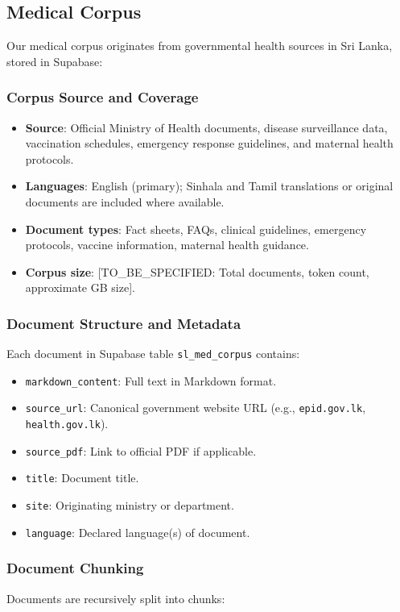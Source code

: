 \documentclass[11pt,a4paper]{article}
\begin{document}
\subsection{Medical Corpus}
\label{sec:dataset-corpus}

Our medical corpus originates from governmental health sources in Sri Lanka, stored in Supabase:

\subsubsection{Corpus Source and Coverage}
\begin{itemize}
    \item \textbf{Source}: Official Ministry of Health documents, disease surveillance data, vaccination schedules, emergency response guidelines, and maternal health protocols.
    \item \textbf{Languages}: English (primary); Sinhala and Tamil translations or original documents are included where available.
    \item \textbf{Document types}: Fact sheets, FAQs, clinical guidelines, emergency protocols, vaccine information, maternal health guidance.
    \item \textbf{Corpus size}: [TO\_BE\_SPECIFIED: Total documents, token count, approximate GB size].
\end{itemize}

\subsubsection{Document Structure and Metadata}
Each document in Supabase table \texttt{sl\_med\_corpus} contains:

\begin{itemize}
    \item \texttt{markdown\_content}: Full text in Markdown format.
    \item \texttt{source\_url}: Canonical government website URL (e.g., \texttt{epid.gov.lk}, \texttt{health.gov.lk}).
    \item \texttt{source\_pdf}: Link to official PDF if applicable.
    \item \texttt{title}: Document title.
    \item \texttt{site}: Originating ministry or department.
    \item \texttt{language}: Declared language(s) of document.
\end{itemize}

\subsubsection{Document Chunking}
Documents are recursively split into chunks:
\end{document}
